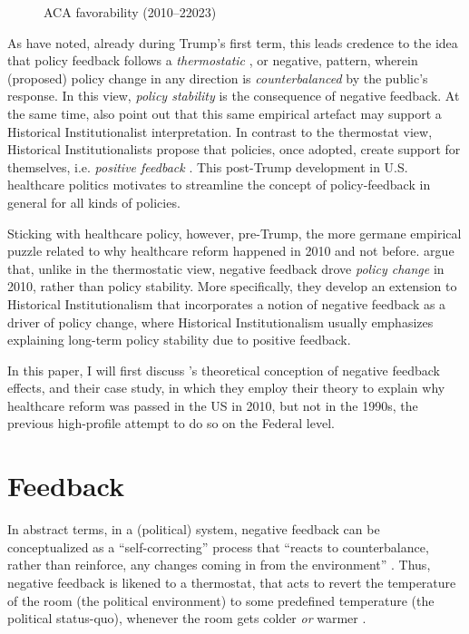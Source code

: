 \documentclass[11pt]{article}
\begin{document}
\begin{figure}[H]
  \sffamily
  \caption{ACA favorability (2010--22023)}
  
  \label{fig:aca_fav}
\end{figure}

\noindent As \textcite[][]{Busemeyer2019} have noted, already during Trump's first term, this leads credence to the idea that policy feedback follows a \textit{thermostatic} \parencite[][]{Wlezien1995}, or negative, pattern, wherein (proposed) policy change in any direction is \textit{counterbalanced} by the public's response. In this view, \textit{policy stability} is the consequence of negative feedback. At the same time, \textcite[][]{Busemeyer2019} also point out that this same empirical artefact may support a Historical Institutionalist interpretation. In contrast to the thermostat view, Historical Institutionalists propose that policies, once adopted, create support for themselves, i.e. \textit{positive feedback} \parencites[see e.g.][]{Pierson1993}{Pierson2000}. This post-Trump development in U.S. healthcare politics motivates \textcite[][]{Busemeyer2019} to streamline the concept of policy-feedback in general for all kinds of policies.

Sticking with healthcare policy, however, pre-Trump, the more germane empirical puzzle related to why healthcare reform happened in 2010 and not before. \textcite[][]{Jacobs2014} argue that, unlike in the thermostatic view, negative feedback drove \textit{policy change} in 2010, rather than policy stability. More specifically, they develop an extension to Historical Institutionalism that incorporates a notion of negative feedback as a driver of policy change, where Historical Institutionalism usually emphasizes explaining long-term policy stability due to positive feedback.

In this paper, I will first discuss \citeauthor[][]{Jacobs2014}'s \parencite*{Jacobs2014} theoretical conception of negative feedback effects, and their case study, in which they employ their theory to explain why healthcare reform was passed in the US in 2010, but not in the 1990s, the previous high-profile attempt to do so on the Federal level.

\section*{Feedback}

In abstract terms, in a (political) system, negative feedback can be conceptualized as a \enquote{self-correcting} \parencite[][p. 8]{Baumgartner2002} process that \enquote{reacts to counterbalance, rather than reinforce, any changes coming in from the environment} . Thus, negative feedback is likened to a thermostat, that acts to revert the temperature of the room (the political environment) to some predefined temperature (the political status-quo), whenever the room gets colder \textit{or} warmer \parencite[][]{Wlezien1995}.
\end{document}

